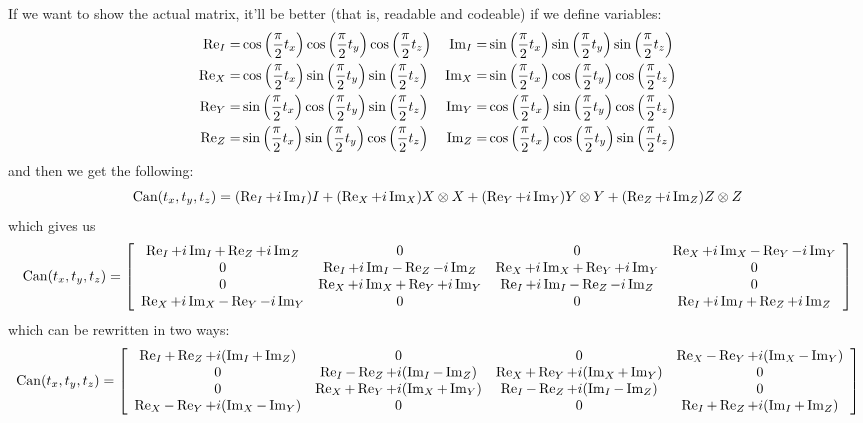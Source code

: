 \documentclass{article}
\DeclareMathOperator{\can}{Can}
\begin{document}
If we want to show the actual matrix, it'll be better (that is, readable and codeable) if we define variables:
\begin{align*}
  \Re_I =& \cos\pqty{\frac{\pi}{2}t_x}\cos\pqty{\frac{\pi}{2}t_y}\cos\pqty{\frac{\pi}{2}t_z}
  &
  \Im_I =& \sin\pqty{\frac{\pi}{2}t_x}\sin\pqty{\frac{\pi}{2}t_y}\sin\pqty{\frac{\pi}{2}t_z} 
  \\
  \Re_X =& \cos\pqty{\frac{\pi}{2}t_x}\sin\pqty{\frac{\pi}{2}t_y}\sin\pqty{\frac{\pi}{2}t_z}
  &
  \Im_X =& \sin\pqty{\frac{\pi}{2}t_x} \cos\pqty{\frac{\pi}{2}t_y}\cos\pqty{\frac{\pi}{2}t_z}
  \\
  \Re_Y =& \sin\pqty{\frac{\pi}{2}t_x} \cos\pqty{\frac{\pi}{2}t_y} \sin\pqty{\frac{\pi}{2}t_z}
  &
  \Im_Y =& \cos\pqty{\frac{\pi}{2}t_x}\sin\pqty{\frac{\pi}{2}t_y}\cos\pqty{\frac{\pi}{2}t_z}
  \\
  \Re_Z =& \sin\pqty{\frac{\pi}{2}t_x}\sin\pqty{\frac{\pi}{2}t_y}\cos\pqty{\frac{\pi}{2}t_z}
  &
  \Im_Z =& \cos\pqty{\frac{\pi}{2}t_x}\cos\pqty{\frac{\pi}{2}t_y}\sin\pqty{\frac{\pi}{2}t_z}
\end{align*}
and then we get the following:
$$
\can(t_x,t_y,t_z) = \pqty{\Re_I + i\Im_I}I + \pqty{\Re_X + i\Im_X}X\otimes X + \pqty{\Re_Y + i\Im_Y}Y\otimes Y + \pqty{\Re_Z + i\Im_Z}Z\otimes Z
$$
which gives us
$$
\can(t_x,t_y,t_z) = 
\bqty{
\begin{array}{cccc}
  \Re_I + i\Im_I + \Re_Z + i\Im_Z & 0 & 0 & \Re_X + i\Im_X - \Re_Y - i\Im_Y \\
  0 & \Re_I + i\Im_I - \Re_Z - i\Im_Z & \Re_X + i\Im_X + \Re_Y + i\Im_Y & 0 \\
  0 & \Re_X + i\Im_X + \Re_Y + i\Im_Y & \Re_I + i\Im_I - \Re_Z - i\Im_Z & 0 \\
  \Re_X + i\Im_X - \Re_Y - i\Im_Y & 0 & 0 & \Re_I + i\Im_I + \Re_Z + i\Im_Z \\
\end{array}
}
$$
which can be rewritten in two ways:
$$
\can(t_x,t_y,t_z) = 
\bqty{
\begin{array}{cccc}
  \Re_I + \Re_Z + i(\Im_I + \Im_Z) & 0 & 0 & \Re_X - \Re_Y + i(\Im_X - \Im_Y) \\
  0 & \Re_I - \Re_Z + i(\Im_I - \Im_Z) & \Re_X + \Re_Y + i(\Im_X + \Im_Y) & 0 \\
  0 & \Re_X + \Re_Y + i(\Im_X + \Im_Y) & \Re_I - \Re_Z + i(\Im_I - \Im_Z) & 0 \\
  \Re_X - \Re_Y + i(\Im_X - \Im_Y) & 0 & 0 & \Re_I + \Re_Z + i(\Im_I + \Im_Z) \\
\end{array}
}
$$
\end{document}
